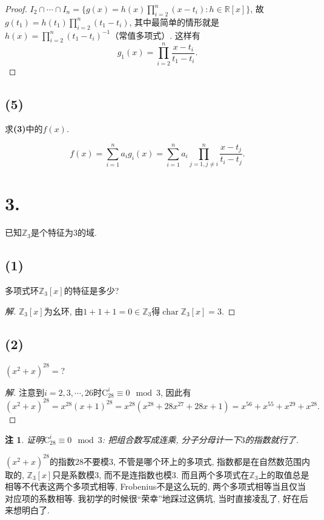 \documentclass[12pt, a4paper, fontset=windows]{ctexart}
\newcommand{\R}{\mathbb{R}}
\newcommand{\Z}{\mathbb{Z}}
\newcommand{\ch}{\operatorname{char}}
\newcommand{\kh}[1]{（{#1}）} %
\newcommand{\yh}[1]{“{#1}”} %
\newtheorem*{remark}{注}
\newenvironment{solution}{\begin{proof}[解]}{\end{proof}}
\begin{document}
\begin{proof}
$I_2\cap\cdots\cap I_n=\{g(x)=h(x)\prod^n_{i=2}(x-t_i):h\in\R[x]\}$, 
故$g(t_1)=h(t_1)\prod^n_{i=2}(t_1-t_i)$, 其中最简单的情形就是
$h(x)=\prod^n_{i=2}(t_1-t_i)^{-1}$\kh{常值多项式}. 这样有
\[g_1(x)=\prod^n_{i=2}\frac{x-t_i}{t_1-t_i}.\]
\end{proof}

\subsection*{(5)}

求{\bf (3)}中的$f(x)$. 

\[f(x)=\sum^n_{i=1}a_ig_i(x)=\sum^n_{i=1}a_i\prod^n_{j=1,j\ne i}\frac{x-t_j}{t_i-t_j}.\]

\section*{3.}

已知$\Z_3$是个特征为$3$的域. 

\subsection*{(1)}

多项式环$\Z_3[x]$的特征是多少? 

\begin{solution}
$\Z_3[x]$为幺环, 由$1+1+1=0\in\Z_3$得$\ch\Z_3[x]=3$. 
\end{solution}

\subsection*{(2)}

$(x^2+x)^{28}=$?

\begin{solution}
注意到$i=2,3,\cdots,26$时$\mathrm{C}^i_{28}\equiv 0\mod{3}$, 因此有
\[(x^2+x)^{28}=x^{28}(x+1)^{28}=x^{28}(x^{28}+28x^{27}+28x+1)=x^{56}+x^{55}+x^{29}+x^{28}.\]
\end{solution}

\begin{remark}
证明$\mathrm{C}^i_{28}\equiv 0\mod{3}$: 把组合数写成连乘, 
分子分母计一下$3$的指数就行了. 
\end{remark}

$(x^2+x)^{28}$的指数$28$不要模$3$, 不管是哪个环上的多项式, 
指数都是在自然数范围内取的, $\Z_3[x]$只是系数模$3$, 而不是连指数也模$3$. 
而且两个多项式在$\Z_3$上的取值总是相等不代表这两个多项式相等, 
Frobenius不是这么玩的, 两个多项式相等当且仅当对应项的系数相等. 
我初学的时候很\yh{荣幸}地踩过这俩坑, 当时直接凌乱了, 好在后来想明白了. 
\end{document}

